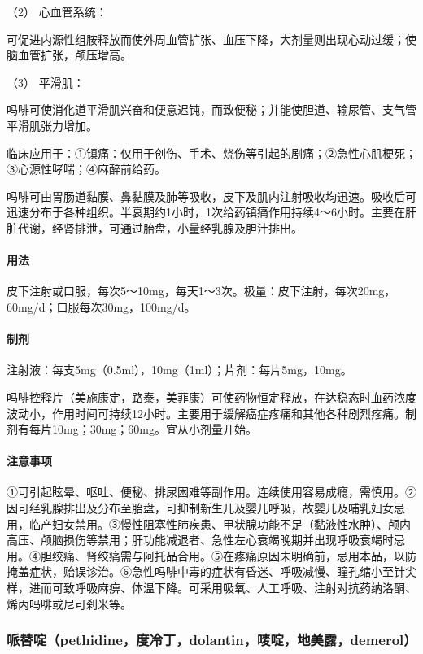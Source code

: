 \hypertarget{text00439.htmlux5cux23CHP17-9-1-1-2}{}
（2） 心血管系统：

可促进内源性组胺释放而使外周血管扩张、血压下降，大剂量则出现心动过缓；使脑血管扩张，颅压增高。

\hypertarget{text00439.htmlux5cux23CHP17-9-1-1-3}{}
（3） 平滑肌：

吗啡可使消化道平滑肌兴奋和便意迟钝，而致便秘；并能使胆道、输尿管、支气管平滑肌张力增加。

临床应用于：①镇痛：仅用于创伤、手术、烧伤等引起的剧痛；②急性心肌梗死；③心源性哮喘；④麻醉前给药。

吗啡可由胃肠道黏膜、鼻黏膜及肺等吸收，皮下及肌内注射吸收均迅速。吸收后可迅速分布于各种组织。半衰期约1小时，1次给药镇痛作用持续4～6小时。主要在肝脏代谢，经肾排泄，可通过胎盘，小量经乳腺及胆汁排出。

\paragraph{用法}

皮下注射或口服，每次5～10mg，每天1～3次。极量：皮下注射，每次20mg，60mg/d；口服每次30mg，100mg/d。

\paragraph{制剂}

注射液：每支5mg（0.5ml），10mg（1ml）；片剂：每片5mg，10mg。

吗啡控释片（美施康定，路泰，美菲康）可使药物恒定释放，在达稳态时血药浓度波动小，作用时间可持续12小时。主要用于缓解癌症疼痛和其他各种剧烈疼痛。制剂有每片10mg；30mg；60mg。宜从小剂量开始。

\paragraph{注意事项}

①可引起眩晕、呕吐、便秘、排尿困难等副作用。连续使用容易成瘾，需慎用。②因可经乳腺排出及分布至胎盘，可抑制新生儿及婴儿呼吸，故婴儿及哺乳妇女忌用，临产妇女禁用。③慢性阻塞性肺疾患、甲状腺功能不足（黏液性水肿）、颅内高压、颅脑损伤等禁用；肝功能减退者、急性左心衰竭晚期并出现呼吸衰竭时忌用。④胆绞痛、肾绞痛需与阿托品合用。⑤在疼痛原因未明确前，忌用本品，以防掩盖症状，贻误诊治。⑥急性吗啡中毒的症状有昏迷、呼吸减慢、瞳孔缩小至针尖样，进而可致呼吸麻痹、体温下降。可采用吸氧、人工呼吸、注射对抗药纳洛酮、烯丙吗啡或尼可刹米等。

\subsubsection{哌替啶（pethidine，度冷丁，dolantin，唛啶，地美露，demerol）}

